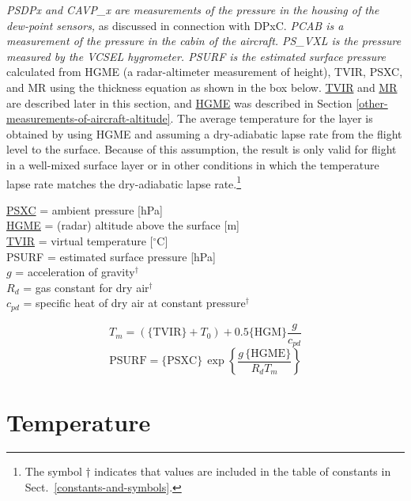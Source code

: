 \documentclass[
]{book}
\begin{document}
\emph{PSDPx and CAVP\_x are measurements of the pressure in the housing of the dew-point sensors,} as discussed in connection with DPxC. \emph{PCAB is a measurement of the pressure in the cabin of the aircraft. PS\_VXL is the pressure measured by the VCSEL hygrometer. PSURF is the estimated surface pressure} calculated from HGME (a radar-altimeter measurement of height), TVIR, PSXC, and MR using the thickness equation as shown in the box below. \protect\hyperlink{TVIR}{TVIR} and \protect\hyperlink{MR}{MR} are described later in this section, and \protect\hyperlink{HGME}{HGME} was described in Section \ref{other-measurements-of-aircraft-altitude}. The average temperature for the layer is obtained by using HGME and assuming a dry-adiabatic lapse rate from the flight level to the surface. Because of this assumption, the result is only valid for flight in a well-mixed surface layer or in other conditions in which the temperature lapse rate matches the dry-adiabatic lapse rate.\footnote{The symbol {†} indicates that values are included in the table of constants in Sect.~\ref{constants-and-symbols}.}

\protect\hyperlink{psx}{PSXC} = ambient pressure {[}hPa{]}\\
\href{./3-the-state-of-the-aircraft.html\#hgme-159}{HGME} = (radar) altitude above the surface {[}m{]}\\
\protect\hyperlink{TVIR}{TVIR} = virtual temperature {[}\(^{\circ}\mathrm{C}\){]}\\
PSURF = estimated surface pressure {[}hPa{]}\\
\(g\) = acceleration of gravity\(^{\dagger}\)\\
\(R_{d}\) = gas constant for dry air\(^{\dagger}\)\\
\(c_{pd}\) = specific heat of dry air at constant pressure\(^{\dagger}\)

\begin{equation}
T_{m}=(\mathrm{\{TVIR\}}+T_{0})+0.5\mathrm{\{HGM\}}\frac{g}{c_{pd}}
\label{eq:Tm4PSURF}
\end{equation}
\begin{equation}
\mathrm{PSURF}=\mathrm{\{PSXC\}}\,\exp\left\{ \frac{g\,\{\mathrm{HGME}\}}{R_{d}T_{m}}\right\}
\label{eq:PSURF}
\end{equation}

\hypertarget{temperature-section}{%
\section{Temperature}\label{temperature-section}}
\end{document}
